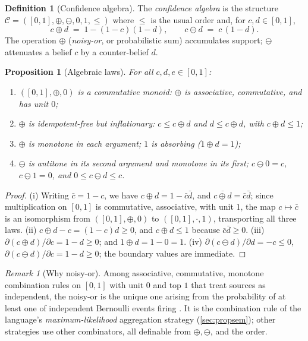 \documentclass[11pt,a4paper]{article}
\theoremstyle{plain}
\newtheorem{proposition}[theorem]{Proposition}
\theoremstyle{definition}
\newtheorem{definition}[theorem]{Definition}
\theoremstyle{remark}
\newtheorem{remark}[theorem]{Remark}
\newcommand{\Conf}{\mathcal{C}}
\newcommand{\Unit}{[0,1]}
\newcommand{\nor}{\oplus}                                 %
\newcommand{\att}{\ominus}                                %
\newcommand{\jspace}{\qquad}
\begin{document}
\begin{definition}[Confidence algebra]
\label{def:confalg}
The \emph{confidence algebra} is the structure
$\Conf = (\Unit, \nor, \att, 0, 1, \le)$ where $\le$ is the usual order and,
for $c,d\in\Unit$,
\[
c \nor d \;=\; 1-(1-c)(1-d), \jspace c \att d \;=\; c\,(1-d).
\]
The operation $\nor$ (\emph{noisy-or}, or probabilistic sum) accumulates
support; $\att$ attenuates a belief $c$ by a counter-belief $d$.
\end{definition}

\begin{proposition}[Algebraic laws]
\label{prop:conflaws}
For all $c,d,e\in\Unit$:
\begin{enumerate}[label=(\roman*),leftmargin=1.9em,nosep]
\item $(\Unit,\nor,0)$ is a commutative monoid: $\nor$ is associative,
commutative, and has unit $0$;
\item $\nor$ is idempotent-free but \emph{inflationary}: $c \le c\nor d$ and
$d \le c\nor d$, with $c\nor d \le 1$;
\item $\nor$ is monotone in each argument; $1$ is absorbing
($1\nor d = 1$);
\item $\att$ is antitone in its second argument and monotone in its first;
$c\att 0 = c$, $c \att 1 = 0$, and $0\le c\att d\le c$.
\end{enumerate}
\end{proposition}
\begin{proof}
(i) Writing $\bar c=1-c$, we have $c\nor d = 1-\bar c\bar d$, and
$\overline{c\nor d}=\bar c\bar d$; since multiplication on $[0,1]$ is
commutative, associative, with unit $1$, the map $c\mapsto\bar c$ is an
isomorphism from $(\Unit,\nor,0)$ to $([0,1],\cdot,1)$, transporting all three
laws. (ii) $c\nor d - c = (1-c)d \ge 0$, and $c\nor d\le 1$ because
$\bar c\bar d\ge 0$. (iii) $\partial(c\nor d)/\partial c = 1-d\ge 0$; and
$1\nor d = 1-0=1$. (iv) $\partial(c\att d)/\partial d=-c\le0$,
$\partial(c\att d)/\partial c = 1-d\ge0$; the boundary values are immediate.
\end{proof}

\begin{remark}[Why noisy-or]
Among associative, commutative, monotone combination rules on $\Unit$ with unit
$0$ and top $1$ that treat sources as independent, the noisy-or is the unique
one arising from the probability of at least one of independent Bernoulli
events firing \citep{pearl1988}. It is the combination rule of the language's
\emph{maximum-likelihood} aggregation strategy (\cref{sec:propsem}); other
strategies use other combinators, all definable from $\nor,\att$, and the
order.
\end{remark}
\end{document}
